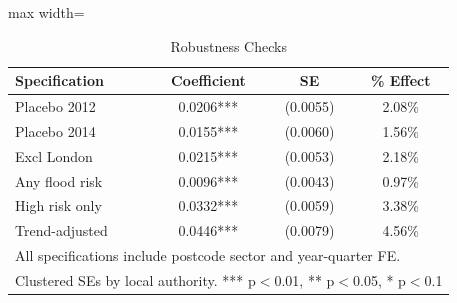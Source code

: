 \begin{table}[htbp]
\centering
\caption{Robustness Checks}
\label{tab:robustness}
\begin{adjustbox}{max width=\textwidth}
\begin{tabular}{lccc}
\hline\hline
Specification & Coefficient & SE & \% Effect \\
\hline
Placebo 2012 & 0.0206*** & (0.0055) & 2.08\% \\
Placebo 2014 & 0.0155*** & (0.0060) & 1.56\% \\
Excl London & 0.0215*** & (0.0053) & 2.18\% \\
Any flood risk & 0.0096*** & (0.0043) & 0.97\% \\
High risk only & 0.0332*** & (0.0059) & 3.38\% \\
Trend-adjusted & 0.0446*** & (0.0079) & 4.56\% \\
\hline\hline
\multicolumn{4}{l}{\footnotesize All specifications include postcode sector and year-quarter FE.} \\
\multicolumn{4}{l}{\footnotesize Clustered SEs by local authority. *** p$<$0.01, ** p$<$0.05, * p$<$0.1} \\
\end{tabular}
\end{adjustbox}
\end{table}
